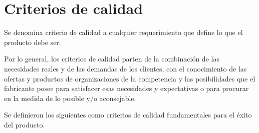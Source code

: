 \section{Criterios de calidad}
Se denomina criterio de calidad a cualquier requerimiento que define lo que el
producto debe ser.

Por lo general, los criterios de calidad parten de la combinación de las
necesidades reales y de las demandas de los clientes, con el conocimiento de las
ofertas y productos de organizaciones de la competencia y las posibilidades que
el fabricante posee para satisfacer esas necesidades y expectativas o para
procurar en la medida de lo posible y/o aconsejable\cite{Haaz}.

Se definieron los siguientes como criterios de calidad fundamentales para el
éxito del producto\cite{Fillottrani}.

